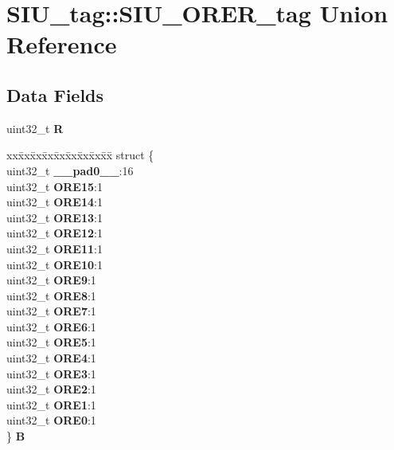 \hypertarget{unionSIU__tag_1_1SIU__ORER__tag}{}\section{S\+I\+U\+\_\+tag\+::S\+I\+U\+\_\+\+O\+R\+E\+R\+\_\+tag Union Reference}
\label{unionSIU__tag_1_1SIU__ORER__tag}
\subsection*{Data Fields}
\begin{DoxyCompactItemize}
\item 
\mbox{\label{unionSIU__tag_1_1SIU__ORER__tag_afa876b31a294ebe6b36ba2680fe0ef20}} 
uint32\+\_\+t {\bfseries R}
\item 
\mbox{\label{unionSIU__tag_1_1SIU__ORER__tag_a4d0d4fe3f6bc96c53e4913f617897e21}} 
\begin{tabbing}
xx\=xx\=xx\=xx\=xx\=xx\=xx\=xx\=xx\=\kill
struct \{\\
\>uint32\_t {\bfseries \_\_pad0\_\_}:16\\
\>uint32\_t {\bfseries ORE15}:1\\
\>uint32\_t {\bfseries ORE14}:1\\
\>uint32\_t {\bfseries ORE13}:1\\
\>uint32\_t {\bfseries ORE12}:1\\
\>uint32\_t {\bfseries ORE11}:1\\
\>uint32\_t {\bfseries ORE10}:1\\
\>uint32\_t {\bfseries ORE9}:1\\
\>uint32\_t {\bfseries ORE8}:1\\
\>uint32\_t {\bfseries ORE7}:1\\
\>uint32\_t {\bfseries ORE6}:1\\
\>uint32\_t {\bfseries ORE5}:1\\
\>uint32\_t {\bfseries ORE4}:1\\
\>uint32\_t {\bfseries ORE3}:1\\
\>uint32\_t {\bfseries ORE2}:1\\
\>uint32\_t {\bfseries ORE1}:1\\
\>uint32\_t {\bfseries ORE0}:1\\
\} {\bfseries B}\\


\end{tabbing}
\end{DoxyCompactItemize}
